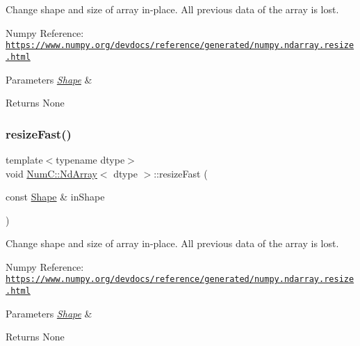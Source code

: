 Change shape and size of array in-\/place. All previous data of the array is lost.

Numpy Reference\+: \href{https://www.numpy.org/devdocs/reference/generated/numpy.ndarray.resize.html}{\tt https\+://www.\+numpy.\+org/devdocs/reference/generated/numpy.\+ndarray.\+resize.\+html}


\begin{DoxyParams}{Parameters}
{\em \mbox{\hyperlink{class_num_c_1_1_shape}{Shape}}} & \\
\hline
\end{DoxyParams}
\begin{DoxyReturn}{Returns}
None 
\end{DoxyReturn}
\mbox{\label{class_num_c_1_1_nd_array_a2426f7ae3429f859e12e61f64965c81c}} 
\subsubsection{\texorpdfstring{resize\+Fast()}{resizeFast()}\hspace{0.1cm}{\footnotesize\ttfamily [2/2]}}
{\footnotesize\ttfamily template$<$typename dtype$>$ \\
void \mbox{\hyperlink{class_num_c_1_1_nd_array}{Num\+C\+::\+Nd\+Array}}$<$ dtype $>$\+::resize\+Fast (\begin{DoxyParamCaption}\item[{const \mbox{\hyperlink{class_num_c_1_1_shape}{Shape}} \&}]{in\+Shape }\end{DoxyParamCaption})\hspace{0.3cm}{\ttfamily [inline]}}

Change shape and size of array in-\/place. All previous data of the array is lost.

Numpy Reference\+: \href{https://www.numpy.org/devdocs/reference/generated/numpy.ndarray.resize.html}{\tt https\+://www.\+numpy.\+org/devdocs/reference/generated/numpy.\+ndarray.\+resize.\+html}


\begin{DoxyParams}{Parameters}
{\em \mbox{\hyperlink{class_num_c_1_1_shape}{Shape}}} & \\
\hline
\end{DoxyParams}
\begin{DoxyReturn}{Returns}
None 
\end{DoxyReturn}
\mbox{\label{class_num_c_1_1_nd_array_abe49f888c39334d1a743f39fe45dc5ea}} 
